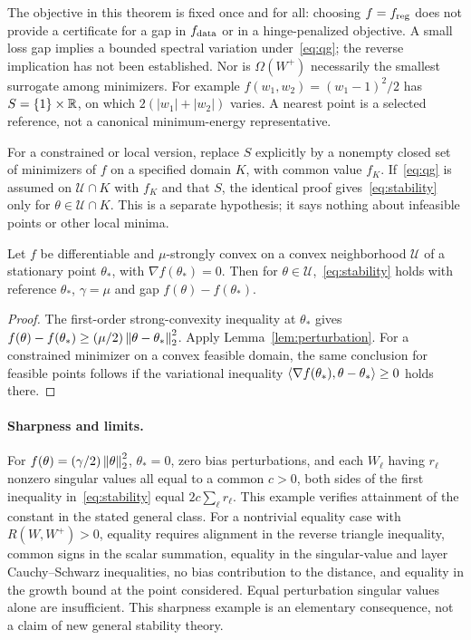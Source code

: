 The objective in this theorem is fixed once and for all: choosing $f=f_{\rm reg}$ does not provide a certificate for a gap in $f_{\rm data}$ or in a hinge-penalized objective. A small loss gap implies a bounded spectral variation under~\eqref{eq:qg}; the reverse implication has not been established. Nor is $\Omega(W^+)$ necessarily the smallest surrogate among minimizers. For example $f(w_1,w_2)=(w_1-1)^2/2$ has $S=\{1\}\times\mathbb R$, on which $2(|w_1|+|w_2|)$ varies. A nearest point is a selected reference, not a canonical minimum-energy representative.

For a constrained or local version, replace $S$ explicitly by a nonempty closed set of minimizers of $f$ on a specified domain $K$, with common value $f_K$. If~\eqref{eq:qg} is assumed on $\mathcal U\cap K$ with $f_K$ and that $S$, the identical proof gives~\eqref{eq:stability} only for $\theta\in\mathcal U\cap K$. This is a separate hypothesis; it says nothing about infeasible points or other local minima.

\begin{corollary}\label{cor:sc}
Let $f$ be differentiable and $\mu$-strongly convex on a convex neighborhood $\mathcal U$ of a stationary point $\theta_*$, with $\nabla f(\theta_*)=0$. Then for $\theta\in\mathcal U$,~\eqref{eq:stability} holds with reference $\theta_*$, $\gamma=\mu$ and gap $f(\theta)-f(\theta_*)$.
\end{corollary}
\begin{proof}
The first-order strong-convexity inequality at $\theta_*$ gives
$f(\theta)-f(\theta_*)\ge(\mu/2)\left\lVert\theta-\theta_*\right\rVert_2^2$. Apply Lemma~\ref{lem:perturbation}. For a constrained minimizer on a convex feasible domain, the same conclusion for feasible points follows if the variational inequality $\left\langle\nabla f(\theta_*),\theta-\theta_*\right\rangle\ge0$ holds there.
\end{proof}

\paragraph{Sharpness and limits.}
For $f(\theta)=(\gamma/2)\left\lVert\theta\right\rVert_2^2$, $\theta_*=0$, zero bias perturbations, and each $W_\ell$ having $r_\ell$ nonzero singular values all equal to a common $c>0$, both sides of the first inequality in~\eqref{eq:stability} equal $2c\sum_\ell r_\ell$. This example verifies attainment of the constant in the stated general class. For a nontrivial equality case with $R(W,W^+)>0$, equality requires alignment in the reverse triangle inequality, common signs in the scalar summation, equality in the singular-value and layer Cauchy--Schwarz inequalities, no bias contribution to the distance, and equality in the growth bound at the point considered. Equal perturbation singular values alone are insufficient. This sharpness example is an elementary consequence, not a claim of new general stability theory.

